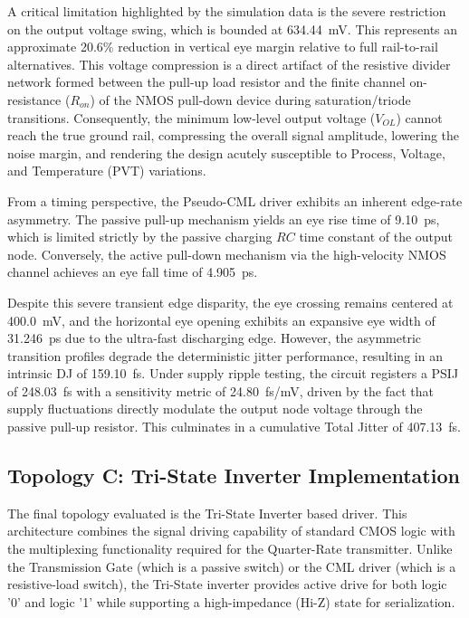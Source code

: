 A critical limitation highlighted by the simulation data is the severe restriction on the output voltage swing, which is bounded at 634.44~mV. This represents an approximate 20.6\% reduction in vertical eye margin relative to full rail-to-rail alternatives. This voltage compression is a direct artifact of the resistive divider network formed between the pull-up load resistor and the finite channel on-resistance ($R_{on}$) of the NMOS pull-down device during saturation/triode transitions. Consequently, the minimum low-level output voltage ($V_{OL}$) cannot reach the true ground rail, compressing the overall signal amplitude, lowering the noise margin, and rendering the design acutely susceptible to Process, Voltage, and Temperature (PVT) variations.

From a timing perspective, the Pseudo-CML driver exhibits an inherent edge-rate asymmetry. The passive pull-up mechanism yields an eye rise time of 9.10~ps, which is limited strictly by the passive charging $RC$ time constant of the output node. Conversely, the active pull-down mechanism via the high-velocity NMOS channel achieves an eye fall time of 4.905~ps. 

Despite this severe transient edge disparity, the eye crossing remains centered at 400.0~mV, and the horizontal eye opening exhibits an expansive eye width of 31.246~ps due to the ultra-fast discharging edge. However, the asymmetric transition profiles degrade the deterministic jitter performance, resulting in an intrinsic DJ of 159.10~fs. Under supply ripple testing, the circuit registers a PSIJ of 248.03~fs with a sensitivity metric of 24.80~fs/mV, driven by the fact that supply fluctuations directly modulate the output node voltage through the passive pull-up resistor. This culminates in a cumulative Total Jitter of 407.13~fs.

\subsection{Topology C: Tri-State Inverter Implementation}
\label{subsec:tinv_impl}

The final topology evaluated is the Tri-State Inverter based driver. This architecture combines the signal driving capability of standard CMOS logic with the multiplexing functionality required for the Quarter-Rate transmitter. Unlike the Transmission Gate (which is a passive switch) or the CML driver (which is a resistive-load switch), the Tri-State inverter provides active drive for both logic '0' and logic '1' while supporting a high-impedance (Hi-Z) state for serialization.

